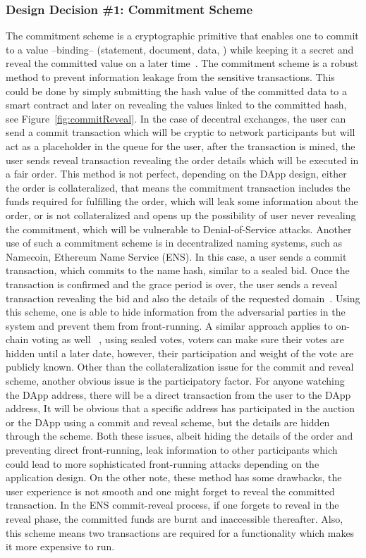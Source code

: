\subsubsection{Design Decision \#1: Commitment Scheme\newline} \label{CommitmentScheme}
The commitment scheme is a cryptographic primitive that enables one to commit to a value --binding-- (\eg statement, document, data, \etc) while keeping it a secret and reveal the committed value on a later time~\cite{brassard1988minimum}. The commitment scheme is a robust method to prevent information leakage from the sensitive transactions. This could be done by simply submitting the hash value of the committed data to a smart contract and later on revealing the values linked to the committed hash, see Figure~\ref{fig:commitReveal}. 
In the case of decentral exchanges, the user can send a commit transaction which will be cryptic to network participants but will act as a placeholder in the queue for the user, after the transaction is mined, the user sends reveal transaction revealing the order details which will be executed in a fair order. This method is not perfect, depending on the DApp design, either the order is collateralized, that means the commitment transaction includes the funds required for fulfilling the order, which will leak some information about the order, or is not collateralized and opens up the possibility of user never revealing the commitment, which will be vulnerable to Denial-of-Service attacks. 
Another use of such a commitment scheme is in decentralized naming systems, such as Namecoin, Ethereum Name Service (ENS). In this case, a user sends a commit transaction, which commits to the name hash, similar to a sealed bid. Once the transaction is confirmed and the grace period is over, the user sends a reveal transaction revealing the bid and also the details of the requested domain~\cite{kalodner2015empirical}. Using this scheme, one is able to hide information from the adversarial parties in the system and prevent them from front-running. A similar approach applies to on-chain voting as well ~\cite{adChainPLCRVoting}, using sealed votes, voters can make sure their votes are hidden until a later date, however, their participation and weight of the vote are publicly known. 
Other than the collateralization issue for the commit and reveal scheme, another obvious issue is the participatory factor. For anyone watching the DApp address, there will be a direct transaction from the user to the DApp address, It will be obvious that a specific address has participated in the auction or the DApp using a commit and reveal scheme, but the details are hidden through the scheme. Both these issues, albeit hiding the details of the order and preventing direct front-running, leak information to other participants which could lead to more sophisticated front-running attacks depending on the application design. On the other note, these method has some drawbacks, the user experience is not smooth and one might forget to reveal the committed transaction. In the ENS commit-reveal process, if one forgets to reveal in the reveal phase, the committed funds are burnt and inaccessible thereafter. Also, this scheme means two transactions are required for a functionality which makes it more expensive to run.

